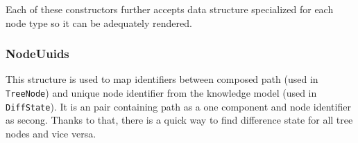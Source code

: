 Each of these constructors further accepts data structure specialized for each node type so it can be adequately rendered.

\subsubsection*{NodeUuids}

This structure is used to map identifiers between composed path (used in \texttt{TreeNode}) and unique node identifier from the knowledge model (used in \texttt{DiffState}).
It is an pair containing path as a one component and node identifier as secong.
Thanks to that, there is a quick way to find difference state for all tree nodes and vice versa.
